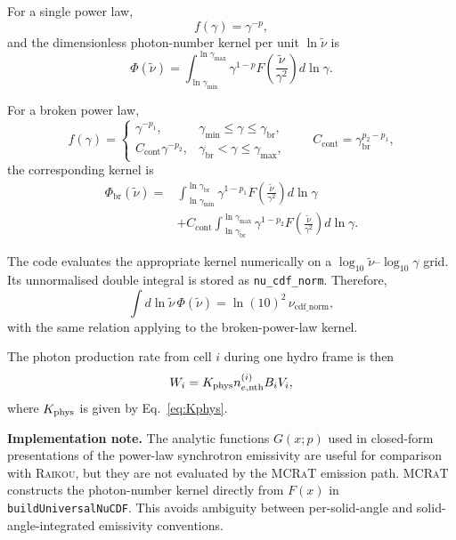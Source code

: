 \documentclass[12pt,a4paper]{article}
\newcommand{\code}[1]{\texttt{#1}}
\newcommand{\raikou}{\textsc{Raikou}}
\newcommand{\mcrat}{\textsc{MCRaT}}
\newenvironment{implementationnote}{%
	\begin{framed}\noindent\textbf{Implementation note.}\quad}
	{\end{framed}}
\begin{document}
For a single power law,
\begin{equation}
	f(\gamma)=\gamma^{-p},
\end{equation}
and the dimensionless photon-number kernel per unit
\(\ln\tilde{\nu}\) is
\begin{equation}
	\Phi(\tilde{\nu})
	=
	\int_{\ln\gamma_{\min}}^{\ln\gamma_{\max}}
	\gamma^{1-p}
	F\!\left(\frac{\tilde{\nu}}{\gamma^2}\right)
	d\ln\gamma .
	\label{eq:single_pl_kernel}
\end{equation}

For a broken power law,
\begin{equation}
	f(\gamma)
	=
	\begin{cases}
		\gamma^{-p_1},
		& \gamma_{\min}\le\gamma\le\gamma_{\mathrm{br}},\\[4pt]
		C_{\mathrm{cont}}\gamma^{-p_2},
		& \gamma_{\mathrm{br}}<\gamma\le\gamma_{\max},
	\end{cases}
	\qquad
	C_{\mathrm{cont}}
	=
	\gamma_{\mathrm{br}}^{p_2-p_1},
	\label{eq:bpl_kernel_definition}
\end{equation}
the corresponding kernel is
\begin{align}
	\Phi_{\mathrm{br}}(\tilde{\nu})
	={}&
	\int_{\ln\gamma_{\min}}^{\ln\gamma_{\mathrm{br}}}
	\gamma^{1-p_1}
	F\!\left(\frac{\tilde{\nu}}{\gamma^2}\right)
	d\ln\gamma
	\nonumber\\
	&+
	C_{\mathrm{cont}}
	\int_{\ln\gamma_{\mathrm{br}}}^{\ln\gamma_{\max}}
	\gamma^{1-p_2}
	F\!\left(\frac{\tilde{\nu}}{\gamma^2}\right)
	d\ln\gamma .
	\label{eq:broken_pl_kernel}
\end{align}

The code evaluates the appropriate kernel numerically on a
\(\log_{10}\tilde{\nu}\)--\(\log_{10}\gamma\) grid. Its unnormalised
double integral is stored as \code{nu\_cdf\_norm}. Therefore,
\begin{equation}
	\int d\ln\tilde{\nu}\,\Phi(\tilde{\nu})
	=
	\ln(10)^2\,\nu_{\mathrm{cdf\_norm}},
	\label{eq:cdf_norm_conversion}
\end{equation}
with the same relation applying to the broken-power-law kernel.

The photon production rate from cell \(i\) during one hydro frame is
then
\begin{equation}
	W_i
	=
	K_{\rm phys}
	n_{e,\mathrm{nth}}^{(i)}
	B_iV_i,
\end{equation}
where \(K_{\rm phys}\) is given by Eq.~\eqref{eq:Kphys}.

\begin{implementationnote}
	The analytic functions \(G(x;p)\) used in closed-form presentations of
	the power-law synchrotron emissivity are useful for comparison with
	\raikou{}, but they are not evaluated by the \mcrat{} emission path.
	\mcrat{} constructs the photon-number kernel directly from \(F(x)\) in
	\code{buildUniversalNuCDF}. This avoids ambiguity between per-solid-angle
	and solid-angle-integrated emissivity conventions.
\end{implementationnote}
\end{document}

